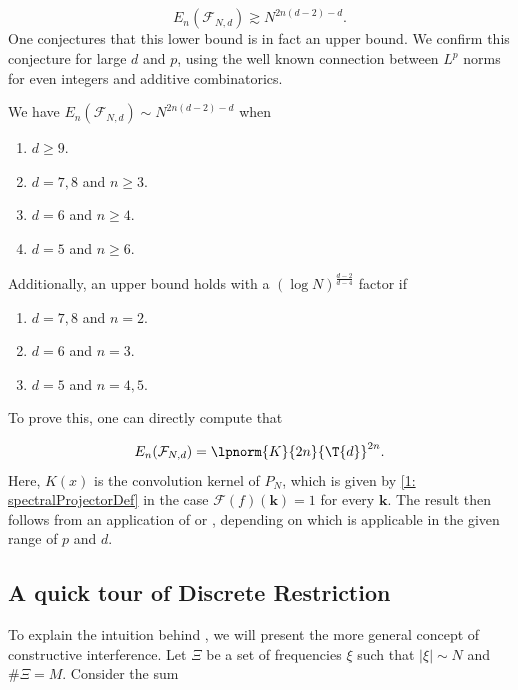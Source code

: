 \documentclass[11pt]{amsart}
\begin{document}
\begin{equation*}
    E_{n}(\mathcal{F}_{N,d})\gtrsim N^{2n(d-2)-d}.
\end{equation*}
One conjectures that this lower bound is in fact an upper bound. We confirm this conjecture for large $d$ and $p$, using the well known connection between $L^p$ norms for even integers and additive combinatorics.

\begin{theorem}\label{1: AdditiveEnergyTheorem}
    We have $ E_{n}(\mathcal{F}_{N,d})\sim N^{2n(d-2)-d}$ when

    \begin{enumerate}
        \item $d\geq 9$.
        \item $d = 7,8$ and $n\geq 3$.
        \item $d=6$ and $n\geq 4$.
        \item $d=5$ and $n\geq 6$.
    \end{enumerate}
    Additionally, an upper bound holds with a $(\log N)^{\frac{d-2}{d-4}}$ factor if 

    \begin{enumerate}
        \item $d=7,8$ and $n= 2$.
        \item $d = 6$ and $n=3$.
        \item $d=5$ and $n= 4,5$.
    \end{enumerate}
\end{theorem}
\noindent
To prove this, one can directly compute that

\begin{equation*}
    E_{n}(\mathcal{F}_{N,d}) = \lpnorm{K}{2n}{\T{d}}^{2n}.
\end{equation*}
Here, $K(x)$ is the convolution kernel of $P_N$, which is given by \eqref{1: spectralProjectorDef} in the case $\mathcal{F}(f)(\mathbf{k})= 1$ for every $\mathbf{k}$. The result then follows from an application of  or , depending on which is applicable in the given range of $p$ and $d$.

\subsection{A quick tour of Discrete Restriction}\label{1: Subsection DiscRestriction}
To explain the intuition behind , we will present the more general concept of constructive interference. Let $\Xi$ be a set of frequencies $\xi$ such that $|\xi|\sim N$ and $\#\Xi = M$. Consider the sum
\end{document}
